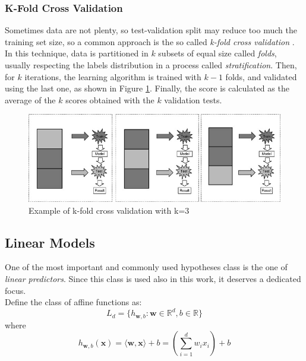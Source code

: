 \subsubsection{K-Fold Cross Validation}
Sometimes data are not plenty, so test-validation split may reduce too much the training set size, so a common approach is the so called \textit{k-fold cross validation} \cite{Refaeilzadeh2009}. In this technique, data is partitioned in $k$ subsets of equal size called \textit{folds}, usually respecting the labels distribution in a process called \textit{stratification}. Then, for $k$ iterations, the learning algorithm is trained with $k-1$ folds, and validated using the last one, as shown in Figure \ref{fig:kfold}. Finally, the score is calculated as the average of the $k$ scores obtained with the $k$ validation tests. 

\begin{figure}[ht]
	\centering
	\includegraphics[width=1\textwidth]{figures/kfold.jpg}
	\caption{Example of k-fold cross validation with k=3}
	\label{fig:kfold}
\end{figure}


\subsection{Linear Models}
One of the most important and commonly used hypotheses class is the one of \textit{linear predictors}. Since this class is used also in this work, it deserves a dedicated focus.\\
Define the class of affine functions as:
\[ L_d = \{h_{\textbf{w},b} : \mathbf{w} \in \mathbb{R}^d, b \in \mathbb{R} \} \]
where
\[ h_{\mathbf{w}, b}(\mathbf{x}) = \langle \mathbf{w},\mathbf{x} \rangle + b = \left( \sum_{i=1}^{d} w_i x_i \right) + b \]

